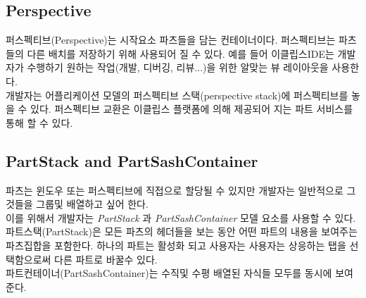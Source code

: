 \subsection{Perspective}
퍼스펙티브(Perspective)는 시작요소 파츠들을 담는 컨테이너이다. 퍼스펙티브는 파츠들의 다른 배치를 저장하기 위해 사용되어 질 수 있다. 예를 들어 이클립스IDE는 개발자가 수행하기 원하는 작업(개발, 디버깅, 리뷰...)을 위한 알맞는 뷰 레이아웃을 사용한다. \\

개발자는 어플리케이션 모델의 퍼스펙티브 스택(perspective stack)에 퍼스펙티브를 놓을 수 있다. 퍼스펙티브 교환은 이클립스 플랫폼에 의해 제공되어 지는 파트 서비스를 통해 할 수 있다. \\

\subsection{PartStack and PartSashContainer}
파츠는 윈도우 또는 퍼스펙티브에 직접으로 할당될 수 있지만 개발자는 일반적으로 그것들을 그룹및 배열하고 싶어 한다. \\

이를 위해서 개발자는 \textit{PartStack} 과 \textit{PartSashContainer} 모델 요소를 사용할 수 있다. \\

파트스택(PartStack)은 모든 파츠의 헤더들을 보는 동안 어떤 파트의 내용을 보여주는 파츠집합을 포함한다. 하나의 파트는 활성화 되고 사용자는 사용자는 상응하는 탭을 선택함으로써 다른 파트로 바꿀수 있다. \\

파트컨테이너(PartSashContainer)는 수직및 수평 배열된 자식들 모두를 동시에 보여준다. \\


